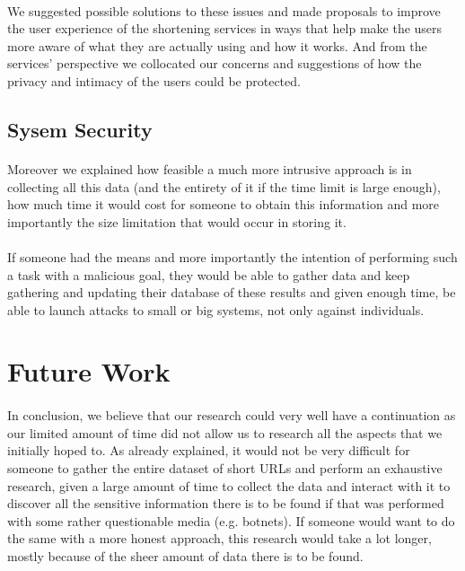 \documentclass[12pt]{article}
\begin{document}
\paragraph{}
We suggested possible solutions to these issues and made proposals to improve the user experience of the shortening services in ways that help make the users more aware of what they are actually using and how it works. And from the services' perspective we collocated our concerns and suggestions of how the privacy and intimacy of the users could be protected.

\subsection{Sysem Security}

\paragraph{}
Moreover we explained how feasible a much more intrusive approach is in collecting all this data (and the entirety of it if the time limit is large enough), how much time it would cost for someone to obtain this information and more importantly the size limitation that would occur in storing it.

\paragraph{}
If someone had the means and more importantly the intention of performing such a task with a malicious goal, they would be able to gather data and keep gathering and updating their database of these results and given enough time, be able to launch attacks to small or big systems, not only against individuals.

\newpage
\section{Future Work}

\paragraph{}
In conclusion, we believe that our research could very well have a continuation as our limited amount of time did not allow us to research all the aspects that we initially hoped to. As already explained, it would not be very difficult for someone to gather the entire dataset of short URLs and perform an exhaustive research, given a large amount of time to collect the data and interact with it to discover all the sensitive information there is to be found if that was performed with some rather questionable media (e.g. botnets). If someone would want to do the same with a more honest approach, this research would take a lot longer, mostly because of the sheer amount of data there is to be found.
\end{document}
